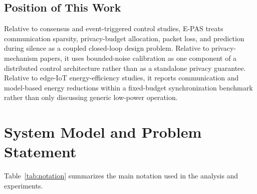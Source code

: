 \documentclass[10pt]{article}
\newcommand{\EPAS}{E-PAS}
\begin{document}
\subsection{Position of This Work}

Relative to consensus and event-triggered control studies, \EPAS{} treats communication sparsity, privacy-budget allocation, packet loss, and prediction during silence as a coupled closed-loop design problem. Relative to privacy-mechanism papers, it uses bounded-noise calibration as one component of a distributed control architecture rather than as a standalone privacy guarantee. Relative to edge-IoT energy-efficiency studies, it reports communication and model-based energy reductions within a fixed-budget synchronization benchmark rather than only discussing generic low-power operation.

\section{System Model and Problem Statement}\label{sec:system}

Table~\ref{tab:notation} summarizes the main notation used in the analysis and experiments.
\end{document}
